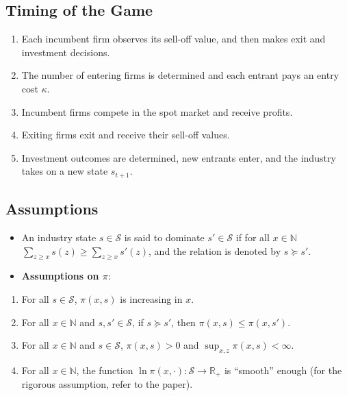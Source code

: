 \documentclass[
]{book}
\providecommand{\tightlist}{%
  \setlength{\itemsep}{0pt}\setlength{\parskip}{0pt}}
\begin{document}
\hypertarget{timing-of-the-game-1}{%
\subsection{Timing of the Game}\label{timing-of-the-game-1}}

\begin{enumerate}
\def\labelenumi{\arabic{enumi}.}
\tightlist
\item
  Each incumbent firm observes its sell-off value, and then makes exit and investment decisions.
\item
  The number of entering firms is determined and each entrant pays an entry cost \(\kappa\).
\item
  Incumbent firms compete in the spot market and receive profits.
\item
  Exiting firms exit and receive their sell-off values.
\item
  Investment outcomes are determined, new entrants enter, and the industry takes on a new state \(s_{t + 1}\).
\end{enumerate}

\hypertarget{assumptions}{%
\subsection{Assumptions}\label{assumptions}}

\begin{itemize}
\tightlist
\item
  An industry state \(s \in \mathcal{S}\) is said to dominate \(s' \in \mathcal{S}\) if for all \(x \in \mathbb{N}\) \(\sum_{z \ge x} s(z) \ge \sum_{z \ge x} s'(z)\), and the relation is denoted by \(s \succeq s'\).
\item
  \textbf{Assumptions on \(\pi\)}:
\end{itemize}

\begin{enumerate}
\def\labelenumi{\arabic{enumi}.}
\tightlist
\item
  For all \(s \in \mathcal{S}\), \(\pi(x, s)\) is increasing in \(x\).
\item
  For all \(x \in \mathbb{N}\) and \(s, s' \in \mathcal{S}\), if \(s \succeq s'\), then \(\pi(x, s) \le \pi(x, s')\).
\item
  For all \(x \in \mathbb{N}\) and \(s \in \mathcal{S}\), \(\pi(x, s) > 0\) and \(\sup_{x, z} \pi(x, s) < \infty\).
\item
  For all \(x \in \mathbb{N}\), the function \(\ln \pi(x, \cdot): \mathcal{S} \to \mathbb{R}_+\) is ``smooth'' enough (for the rigorous assumption, refer to the paper).
\end{enumerate}
\end{document}
